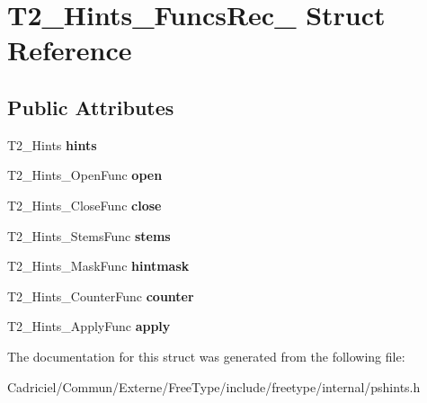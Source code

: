 \hypertarget{struct_t2___hints___funcs_rec__}{}\section{T2\+\_\+\+Hints\+\_\+\+Funcs\+Rec\+\_\+ Struct Reference}
\label{struct_t2___hints___funcs_rec__}
\subsection*{Public Attributes}
\begin{DoxyCompactItemize}
\item 
T2\+\_\+\+Hints {\bfseries hints}\hypertarget{struct_t2___hints___funcs_rec___af8daab694889bede5a513fbae5f86e25}{}\label{struct_t2___hints___funcs_rec___af8daab694889bede5a513fbae5f86e25}

\item 
T2\+\_\+\+Hints\+\_\+\+Open\+Func {\bfseries open}\hypertarget{struct_t2___hints___funcs_rec___a1a5e0b296ee2e2ae6711b3ee35e5fcd9}{}\label{struct_t2___hints___funcs_rec___a1a5e0b296ee2e2ae6711b3ee35e5fcd9}

\item 
T2\+\_\+\+Hints\+\_\+\+Close\+Func {\bfseries close}\hypertarget{struct_t2___hints___funcs_rec___a7e50e26fd55254044bc9f2ba62574352}{}\label{struct_t2___hints___funcs_rec___a7e50e26fd55254044bc9f2ba62574352}

\item 
T2\+\_\+\+Hints\+\_\+\+Stems\+Func {\bfseries stems}\hypertarget{struct_t2___hints___funcs_rec___a12bfd8bae5d3df8f570fcdfb70c00139}{}\label{struct_t2___hints___funcs_rec___a12bfd8bae5d3df8f570fcdfb70c00139}

\item 
T2\+\_\+\+Hints\+\_\+\+Mask\+Func {\bfseries hintmask}\hypertarget{struct_t2___hints___funcs_rec___af50d0cadda7033d7dbd27a199ccfcdd4}{}\label{struct_t2___hints___funcs_rec___af50d0cadda7033d7dbd27a199ccfcdd4}

\item 
T2\+\_\+\+Hints\+\_\+\+Counter\+Func {\bfseries counter}\hypertarget{struct_t2___hints___funcs_rec___ad9d856a64b4a8556fc8d74bae1779e11}{}\label{struct_t2___hints___funcs_rec___ad9d856a64b4a8556fc8d74bae1779e11}

\item 
T2\+\_\+\+Hints\+\_\+\+Apply\+Func {\bfseries apply}\hypertarget{struct_t2___hints___funcs_rec___abaf12efb416bd79cf4ce72b13e6fc68f}{}\label{struct_t2___hints___funcs_rec___abaf12efb416bd79cf4ce72b13e6fc68f}

\end{DoxyCompactItemize}


The documentation for this struct was generated from the following file\+:\begin{DoxyCompactItemize}
\item 
Cadriciel/\+Commun/\+Externe/\+Free\+Type/include/freetype/internal/pshints.\+h\end{DoxyCompactItemize}
